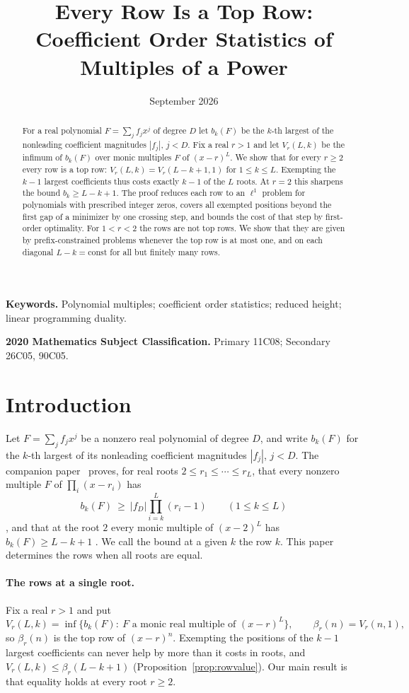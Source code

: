 \documentclass[11pt]{article}
\title{Every Row Is a Top Row: Coefficient Order Statistics of Multiples of a Power}
\author{\shortstack{Bangyen Pham\\
\small Independent Researcher\\
\small\href{mailto:bangyenp@gmail.com}{\texttt{bangyenp@gmail.com}}\\
\small\href{https://orcid.org/0009-0006-9928-2088}{ORCID: 0009-0006-9928-2088}}}
\date{September 2026}
\begin{document}
\maketitle

\begin{abstract}
For a real polynomial $F=\sum_jf_jx^j$ of degree $D$ let $b_k(F)$ be the
$k$-th largest of the nonleading coefficient magnitudes $|f_j|$, $j<D$.  Fix
a real $r>1$ and let $V_r(L,k)$ be the infimum of $b_k(F)$ over monic
multiples $F$ of $(x-r)^L$.  We show that for every $r\ge2$ every row is a
top row: $V_r(L,k)=V_r(L-k+1,1)$ for $1\le k\le L$.  Exempting the $k-1$
largest coefficients thus costs exactly $k-1$ of the $L$ roots.  At $r=2$
this sharpens the bound $b_k\ge L-k+1$.  The proof reduces each row to an
$\ell^1$ problem for polynomials with prescribed integer zeros, covers all
exempted positions beyond the first gap of a minimizer by one crossing step,
and bounds the cost of that step by first-order optimality.  For $1<r<2$ the
rows are not top rows.  We show that they are given by
prefix-constrained problems whenever the top row is at most one, and on each diagonal $L-k=\mathrm{const}$ for all but finitely many
rows.
\end{abstract}

\noindent\textbf{Keywords.} Polynomial multiples; coefficient order
statistics; reduced height; linear programming duality.

\noindent\textbf{2020 Mathematics Subject Classification.} Primary 11C08; Secondary 26C05, 90C05.

\section{Introduction}

Let $F=\sum_jf_jx^j$ be a nonzero real polynomial of degree $D$, and write
$b_k(F)$ for the $k$-th largest of its nonleading coefficient magnitudes
$|f_j|$, $j<D$.  The companion paper~\cite{coefficient-mass} proves, for real
roots $2\le r_1\le\cdots\le r_L$, that every nonzero multiple $F$ of
$\prod_i(x-r_i)$ has
\[
  b_k(F)\ \ge\ |f_D|\prod_{i=k}^L(r_i-1)\qquad(1\le k\le L)
\]
\cite[Theorem~3.2]{coefficient-mass}, and that at the root $2$ every monic
multiple of $(x-2)^L$ has $b_k(F)\ge L-k+1$
\cite[Theorem~4.13]{coefficient-mass}.  We call the bound at a given $k$
the row $k$.  This paper determines the rows when all roots are equal.

\paragraph{The rows at a single root.}
Fix a real $r>1$ and put
\[
  V_r(L,k)=\inf\{b_k(F):\ F\text{ a monic real multiple of }(x-r)^L\},
  \qquad \beta_r(n)=V_r(n,1),
\]
so $\beta_r(n)$ is the top row of $(x-r)^n$.  Exempting the positions of
the $k-1$ largest coefficients can never help by more than it costs in
roots, and $V_r(L,k)\le\beta_r(L-k+1)$
(Proposition~\ref{prop:rowvalue}).  Our main result is that equality holds
at every root $r\ge2$.
\end{document}
